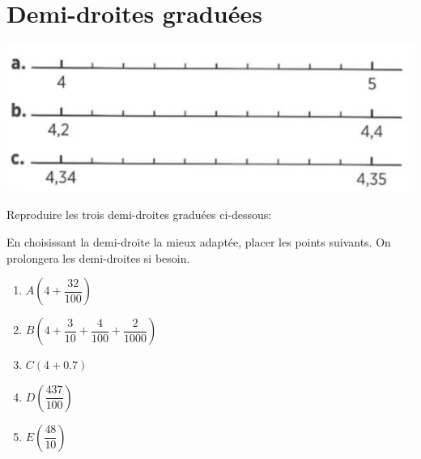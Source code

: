\section{Demi-droites graduées}

\begin{center}
	\includegraphics[scale=0.35]{img/axes}
\end{center}

\begin{questions}
	\question Reproduire les trois demi-droites graduées ci-dessous:
	
	\question En choisissant la demi-droite la mieux adaptée, placer les points suivants. On prolongera les demi-droites si besoin.
	
	\begin{multicols}{2}
		\begin{enumerate}
			\item $A\left( 4 + \dfrac{32}{100}\right)$
			\item $B\left(4 + \dfrac{3}{10} + \dfrac{4}{100} + \dfrac{2}{\num{1000}}\right)$
			\item $C(4 + \num{0.7})$
			\item $D\left(\dfrac{437}{100}\right)$
			\item $E\left(\dfrac{48}{10}\right)$
		\end{enumerate}
	\end{multicols}
\end{questions}
